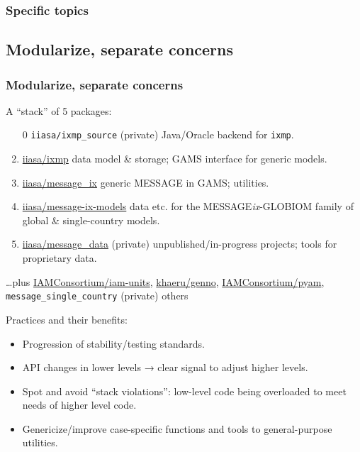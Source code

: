 \documentclass[12pt,aspectratio=169]{beamer}
\begin{document}
\begin{frame}
\frametitle{Specific topics}


\end{frame}

\subsection{Modularize, separate concerns}
\begin{frame}[allowframebreaks]
\frametitle{Modularize, separate concerns}

A “stack” of 5 packages:
\begin{enumerate}
  \item [0] \texttt{iiasa/ixmp\_source} (private) Java/Oracle backend for \texttt{ixmp}.
  \item \href{https://github.com/iiasa/ixmp}{\ttfamily iiasa/ixmp} data model \& storage; GAMS interface for generic models.
  \item \href{https://github.com/iiasa/message_ix}{\ttfamily iiasa/message\_ix} generic MESSAGE in GAMS; utilities.
  \item \href{https://github.com/iiasa/message-ix-models}{\ttfamily iiasa/message-ix-models} data etc. for the MESSAGE\emph{ix}-GLOBIOM family of global \& single-country models.
  \item \href{https://github.com/iiasa/message_data}{\ttfamily iiasa/message\_data} (private) unpublished/in-progress projects; tools for proprietary data.
\end{enumerate}
\medskip
…plus
\href{https://github.com/IAMConsortium/iam-units}{\ttfamily IAMConsortium/iam-units},
\href{https://github.com/khaeru/genno}{\ttfamily khaeru/genno},
\href{https://github.com/IAMConsortium/pyam}{\ttfamily IAMConsortium/pyam},
\texttt{message\_single\_country} (private)
others

\framebreak
Practices and their benefits:
\begin{itemize}
  \item Progression of stability/testing standards.
  \item API changes in lower levels → clear signal to adjust higher levels.
  \item Spot and avoid “stack violations”: low-level code being overloaded to meet needs of higher level code.
  \item Genericize/improve case-specific functions and tools to general-purpose utilities.
\end{itemize}

\end{frame}
\end{document}

